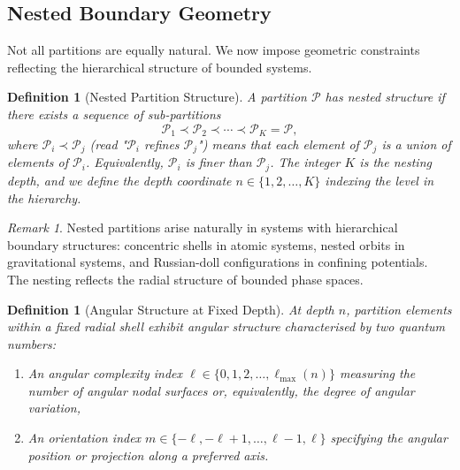 \documentclass[twocolumn,10pt,a4paper]{article}
\newtheorem{definition}[theorem]{Definition}
\theoremstyle{remark}
\newtheorem{remark}[theorem]{Remark}
\newcommand{\partition}{\mathcal{P}}
\begin{document}
\subsection{Nested Boundary Geometry}

Not all partitions are equally natural. We now impose geometric constraints reflecting the hierarchical structure of bounded systems.

\begin{definition}[Nested Partition Structure]
\label{def:nested_partition}
A partition $\partition$ has \emph{nested structure} if there exists a sequence of sub-partitions
\begin{equation}
\partition_1 \prec \partition_2 \prec \cdots \prec \partition_K = \partition,
\end{equation}
where $\partition_i \prec \partition_j$ (read "$\partition_i$ refines $\partition_j$") means that each element of $\partition_j$ is a union of elements of $\partition_i$. Equivalently, $\partition_i$ is finer than $\partition_j$. The integer $K$ is the \emph{nesting depth}, and we define the \emph{depth coordinate} $n \in \{1, 2, \ldots, K\}$ indexing the level in the hierarchy.
\end{definition}

\begin{remark}
Nested partitions arise naturally in systems with hierarchical boundary structures: concentric shells in atomic systems, nested orbits in gravitational systems, and Russian-doll configurations in confining potentials. The nesting reflects the radial structure of bounded phase spaces.
\end{remark}

\begin{definition}[Angular Structure at Fixed Depth]
\label{def:angular_structure}
At depth $n$, partition elements within a fixed radial shell exhibit \emph{angular structure} characterised by two quantum numbers:
\begin{enumerate}[label=(\roman*), noitemsep]
    \item An \emph{angular complexity} index $\ell \in \{0, 1, 2, \ldots, \ell_{\max}(n)\}$ measuring the number of angular nodal surfaces or, equivalently, the degree of angular variation,
    \item An \emph{orientation} index $m \in \{-\ell, -\ell+1, \ldots, \ell-1, \ell\}$ specifying the angular position or projection along a preferred axis.
\end{enumerate}
\end{definition}
\end{document}
